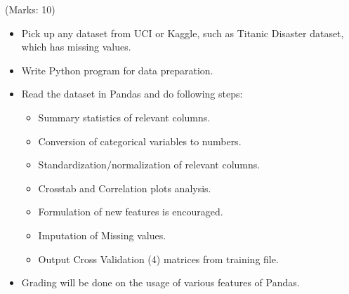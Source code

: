 \begin{homeworkProblem}
(Marks: 10)
\begin{itemize}
\item Pick up any dataset from UCI or Kaggle, such as Titanic Disaster dataset, which has missing values.
\item Write Python program for data preparation.
\item Read the dataset in Pandas and do following steps:
\begin{itemize}
\item Summary statistics of relevant columns.
\item Conversion of categorical variables to numbers.
\item Standardization/normalization of relevant columns.
\item Crosstab and Correlation plots analysis.
\item Formulation of new features is encouraged.
\item Imputation of Missing values.
\item Output Cross Validation (4) matrices from training file.
\end{itemize}
\item Grading will be done on the usage of various features of Pandas.
\end{itemize}
\end{homeworkProblem}


